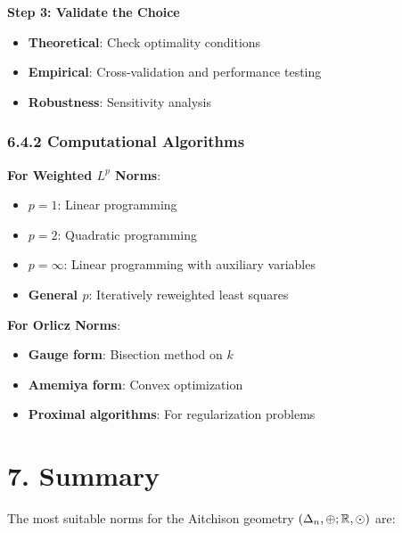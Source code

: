 \documentclass{amsart}
\let\originalmathbb\mathbb
\renewcommand{\mathbb}[1]{%
    \ifstrequal{#1}{1}{\mathbbm{#1}}{\originalmathbb{#1}}%
}
\theoremstyle{plain}
\theoremstyle{definition}
\theoremstyle{remark}
\begin{document}
\textbf{Step 3: Validate the Choice}

\begin{itemize}
	\item \textbf{Theoretical}: Check optimality conditions
	\item \textbf{Empirical}: Cross-validation and performance testing
	\item \textbf{Robustness}: Sensitivity analysis
\end{itemize}

\subsubsection{6.4.2 Computational Algorithms}

\textbf{For Weighted $L^p$ Norms}:

\begin{itemize}
	\item \textbf{$p = 1$}: Linear programming
	\item \textbf{$p = 2$}: Quadratic programming
	\item \textbf{$p = \infty$}: Linear programming with auxiliary variables
	\item \textbf{General $p$}: Iteratively reweighted least squares
\end{itemize}

\textbf{For Orlicz Norms}:

\begin{itemize}
	\item \textbf{Gauge form}: Bisection method on $k$
	\item \textbf{Amemiya form}: Convex optimization
	\item \textbf{Proximal algorithms}: For regularization problems
\end{itemize}

\section{7. Summary}

The most suitable norms for the Aitchison geometry $(\Delta_n,\oplus;\mathbb{R},\odot)$ are:
\end{document}
